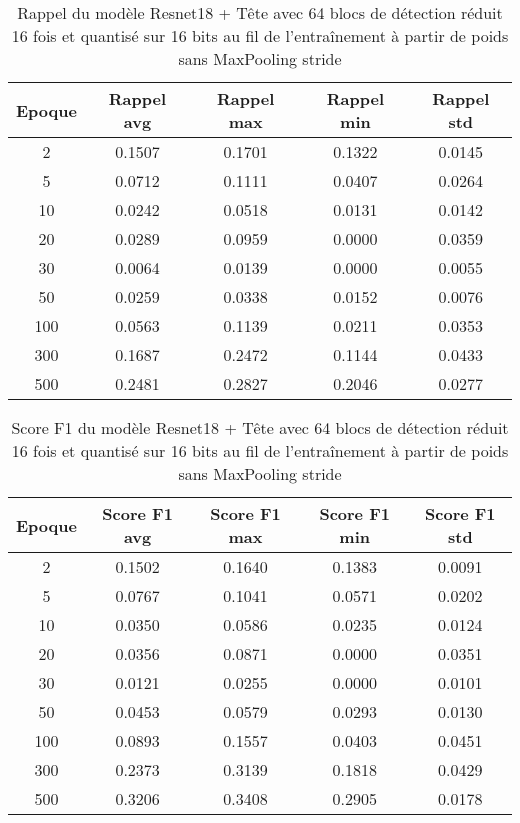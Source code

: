 \begin{table}[!ht]
    \caption{Rappel du modèle Resnet18 + Tête avec 64 blocs de détection réduit 16 fois et quantisé sur 16 bits au fil de l'entraînement à partir de poids sans MaxPooling stride}
    \label{tab:qresnet18+head_64n_reduced_16x_rappel_16b_from_weights_wo_maxpool_stride}
    \centering
    \begin{tabular}{ |c||c|c|c|c|  }
        \hline
        \rowcolor{gray!50}
        Epoque & Rappel avg & Rappel max & Rappel min & Rappel std\\
        \hline
        2 & 0.1507 & 0.1701 & 0.1322 & 0.0145\\
        5 & 0.0712 & 0.1111 & 0.0407 & 0.0264\\
        10 & 0.0242 & 0.0518 & 0.0131 & 0.0142\\
        20 & 0.0289 & 0.0959 & 0.0000 & 0.0359\\
        30 & 0.0064 & 0.0139 & 0.0000 & 0.0055\\
        50 & 0.0259 & 0.0338 & 0.0152 & 0.0076\\
        100 & 0.0563 & 0.1139 & 0.0211 & 0.0353\\
        300 & 0.1687 & 0.2472 & 0.1144 & 0.0433\\
        500 & 0.2481 & 0.2827 & 0.2046 & 0.0277\\
        \hline
    \end{tabular}
\end{table}

\begin{table}[!ht]
    \caption{Score F1 du modèle Resnet18 + Tête avec 64 blocs de détection réduit 16 fois et quantisé sur 16 bits au fil de l'entraînement à partir de poids sans MaxPooling stride}
    \label{tab:qresnet18+head_64n_reduced_16x_f1score_16b_from_weights_wo_maxpool_stride}
    \centering
    \begin{tabular}{ |c||c|c|c|c|  }
        \hline
        \rowcolor{gray!50}
        Epoque & Score F1 avg & Score F1 max & Score F1 min & Score F1 std\\
        \hline
        2 & 0.1502 & 0.1640 & 0.1383 & 0.0091\\
        5 & 0.0767 & 0.1041 & 0.0571 & 0.0202\\
        10 & 0.0350 & 0.0586 & 0.0235 & 0.0124\\
        20 & 0.0356 & 0.0871 & 0.0000 & 0.0351\\
        30 & 0.0121 & 0.0255 & 0.0000 & 0.0101\\
        50 & 0.0453 & 0.0579 & 0.0293 & 0.0130\\
        100 & 0.0893 & 0.1557 & 0.0403 & 0.0451\\
        300 & 0.2373 & 0.3139 & 0.1818 & 0.0429\\
        500 & 0.3206 & 0.3408 & 0.2905 & 0.0178\\
        \hline
    \end{tabular}
\end{table}

